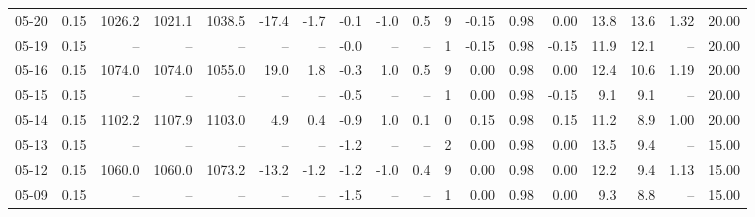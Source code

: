 \begin{threeparttable}
{\begin{tabular}{lrrrrrrrrrrrrrrrrr}
  05-20 &     0.15 & 1026.2 & 1021.1 & 1038.5 &      -17.4 &           -1.7 &                      -0.1 &                     -1.0 &                 0.5 &              9 &      -0.15 &      0.98 &           0.00 &             13.8 &                13.6 &            1.32 &                  20.00 \\
  05-19 &     0.15 &     -- &     -- &     -- &         -- &             -- &                      -0.0 &                       -- &                  -- &              1 &      -0.15 &      0.98 &          -0.15 &             11.9 &                12.1 &              -- &                  20.00 \\
  05-16 &     0.15 & 1074.0 & 1074.0 & 1055.0 &       19.0 &            1.8 &                      -0.3 &                      1.0 &                 0.5 &              9 &       0.00 &      0.98 &           0.00 &             12.4 &                10.6 &            1.19 &                  20.00 \\
  05-15 &     0.15 &     -- &     -- &     -- &         -- &             -- &                      -0.5 &                       -- &                  -- &              1 &       0.00 &      0.98 &          -0.15 &              9.1 &                 9.1 &              -- &                  20.00 \\
  05-14 &     0.15 & 1102.2 & 1107.9 & 1103.0 &        4.9 &            0.4 &                      -0.9 &                      1.0 &                 0.1 &              0 &       0.15 &      0.98 &           0.15 &             11.2 &                 8.9 &            1.00 &                  20.00 \\
  05-13 &     0.15 &     -- &     -- &     -- &         -- &             -- &                      -1.2 &                       -- &                  -- &              2 &       0.00 &      0.98 &           0.00 &             13.5 &                 9.4 &              -- &                  15.00 \\
  05-12 &     0.15 & 1060.0 & 1060.0 & 1073.2 &      -13.2 &           -1.2 &                      -1.2 &                     -1.0 &                 0.4 &              9 &       0.00 &      0.98 &           0.00 &             12.2 &                 9.4 &            1.13 &                  15.00 \\
  05-09 &     0.15 &     -- &     -- &     -- &         -- &             -- &                      -1.5 &                       -- &                  -- &              1 &       0.00 &      0.98 &           0.00 &              9.3 &                 8.8 &              -- &                  15.00 \\

\end{tabular}}
\end{threeparttable}
